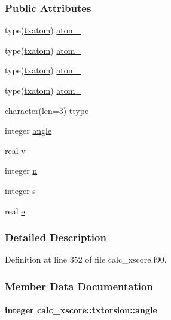 \subsubsection*{Public Attributes}
\begin{DoxyCompactItemize}
\item 
type(\hyperlink{structcalc__xscore_1_1txatom}{txatom}) \hyperlink{structcalc__xscore_1_1txtorsion_a95424190a823201181042aec98bde284}{atom\-\_}
\item 
type(\hyperlink{structcalc__xscore_1_1txatom}{txatom}) \hyperlink{structcalc__xscore_1_1txtorsion_adf628efe9b15da1a417eb76bff90cf18}{atom\-\_}
\item 
type(\hyperlink{structcalc__xscore_1_1txatom}{txatom}) \hyperlink{structcalc__xscore_1_1txtorsion_a4692d0e007331503976ff69d53610b59}{atom\-\_}
\item 
type(\hyperlink{structcalc__xscore_1_1txatom}{txatom}) \hyperlink{structcalc__xscore_1_1txtorsion_afe6397b6332574cc23f56b5e986acaba}{atom\-\_}
\item 
character(len=3) \hyperlink{structcalc__xscore_1_1txtorsion_af349b0e6a8c9d9bae0474e91e130ceef}{ttype}
\item 
integer \hyperlink{structcalc__xscore_1_1txtorsion_a57d4e674909e6b8204a4bb9a342dcc34}{angle}
\item 
real \hyperlink{structcalc__xscore_1_1txtorsion_ab544eccb9d433f0e931539d940d9d376}{v}
\item 
integer \hyperlink{structcalc__xscore_1_1txtorsion_af40518b8daaef5dd86b51c55408a87e3}{n}
\item 
integer \hyperlink{structcalc__xscore_1_1txtorsion_a99e0387c10d669d8c749ff711df56683}{s}
\item 
real \hyperlink{structcalc__xscore_1_1txtorsion_a9902e7ce0a1b1a905386ad7004774b2b}{e}
\end{DoxyCompactItemize}


\subsubsection{Detailed Description}


Definition at line 352 of file calc\-\_\-xscore.\-f90.



\subsubsection{Member Data Documentation}
\hypertarget{structcalc__xscore_1_1txtorsion_a57d4e674909e6b8204a4bb9a342dcc34}{
\paragraph[{angle}]{\setlength{\rightskip}{0pt plus 5cm}integer calc\-\_\-xscore\-::txtorsion\-::angle}}\label{structcalc__xscore_1_1txtorsion_a57d4e674909e6b8204a4bb9a342dcc34}



